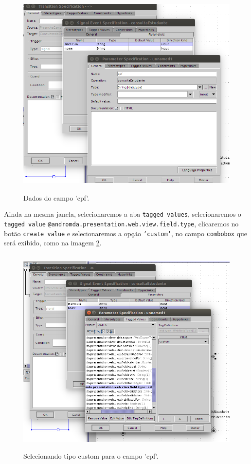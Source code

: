 \begin{figure}[H]
	\centering
	\includegraphics[width=350pt,height=300pt]{files/imgs/tutorial-mdarte-0033.png}
	\caption{Dados do campo 'cpf'.}
	\label{dados_campo_custom_cpf}
\end{figure}

Ainda na mesma janela, selecionaremos a aba \texttt{tagged values},
selecionaremos o \texttt{tagged value} 
\texttt{@andromda.presentation.web.view.field.type}, clicaremos no botão
\texttt{create value} e selecionaremos a opção \texttt{'custom'}, no campo
\texttt{combobox} que será exibido, como na imagem \ref{parametro_cpf_custom}.

\begin{figure}[H]
	\centering
	\includegraphics[width=350pt,height=300pt]{files/imgs/tutorial-mdarte-0034.png}
	\caption{Selecionando tipo custom para o campo 'cpf'.}
	\label{parametro_cpf_custom}
\end{figure}

